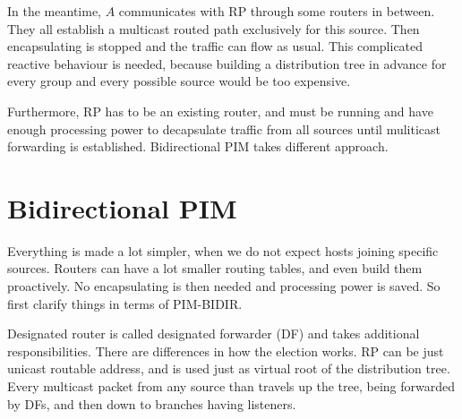 In the meantime, $A$ communicates with RP through some routers in between. They
all establish a multicast routed path exclusively for this source. Then
encapsulating is stopped and the traffic can flow as usual. This complicated
reactive behaviour is needed, because building a distribution tree in advance
for every group and every possible source would be too expensive.

Furthermore, RP has to be an existing router, and must be running and have
enough processing power to decapsulate traffic from all sources until
muliticast forwarding is established. Bidirectional PIM takes different
approach.

\section{Bidirectional PIM}

Everything is made a lot simpler, when we do not expect hosts joining specific
sources. Routers can have a lot smaller routing tables, and even build them
proactively. No encapsulating is then needed and processing power is saved. So
first clarify things in terms of PIM-BIDIR.

Designated router is called designated forwarder (DF) and takes additional
responsibilities. There are differences in how the election works. RP can be
just unicast routable address, and is used just as virtual root of the
distribution tree. Every multicast packet from any source than travels up the
tree, being forwarded by DFs, and then down to branches having listeners.
